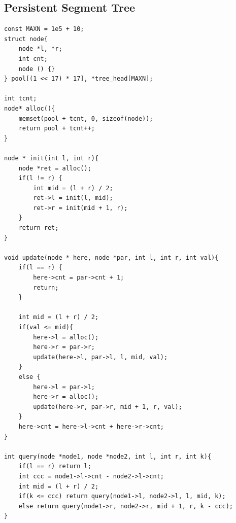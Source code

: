 \documentclass[landscape, 8pt, a4paper, oneside, twocolumn]{extarticle}
\begin{document}
\subsection{Persistent Segment Tree}
\begin{verbatim}
const MAXN = 1e5 + 10;
struct node{
    node *l, *r;
    int cnt;
    node () {}  
} pool[(1 << 17) * 17], *tree_head[MAXN];

int tcnt;
node* alloc(){
    memset(pool + tcnt, 0, sizeof(node));
    return pool + tcnt++;
}

node * init(int l, int r){
    node *ret = alloc();
    if(l != r) {
        int mid = (l + r) / 2;
        ret->l = init(l, mid);
        ret->r = init(mid + 1, r);
    }
    return ret;
}

void update(node * here, node *par, int l, int r, int val){
    if(l == r) {
        here->cnt = par->cnt + 1;
        return;
    }

    int mid = (l + r) / 2;
    if(val <= mid){
        here->l = alloc();
        here->r = par->r;
        update(here->l, par->l, l, mid, val);
    }
    else {
        here->l = par->l;
        here->r = alloc();
        update(here->r, par->r, mid + 1, r, val);
    }
    here->cnt = here->l->cnt + here->r->cnt;
}

int query(node *node1, node *node2, int l, int r, int k){
    if(l == r) return l;
    int ccc = node1->l->cnt - node2->l->cnt;
    int mid = (l + r) / 2;
    if(k <= ccc) return query(node1->l, node2->l, l, mid, k);
    else return query(node1->r, node2->r, mid + 1, r, k - ccc);
}
\end{verbatim}
\end{document}
